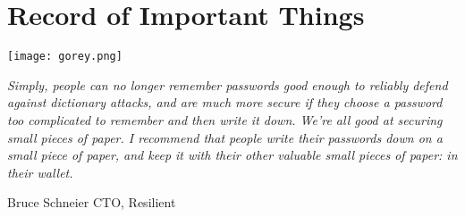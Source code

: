 \documentclass[12pt]{book}
\begin{document}



\newpage

\chapter*{Record of Important Things}

\begin{center}
	\texttt{[image: gorey.png]}
\end{center}

\begin{small}
\textit{Simply, people can no longer remember passwords good enough to reliably defend against dictionary attacks, and are much more secure if they choose a password too complicated to remember and then write it down. We're all good at securing small pieces of paper. I recommend that people write their passwords down on a small piece of paper, and keep it with their other valuable small pieces of paper: in their wallet.}
\begin{flushright}{Bruce Schneier CTO, Resilient}\end{flushright}
\end{small}



\clearpage
{}
\pagestyle{headings}





























































\end{document}
